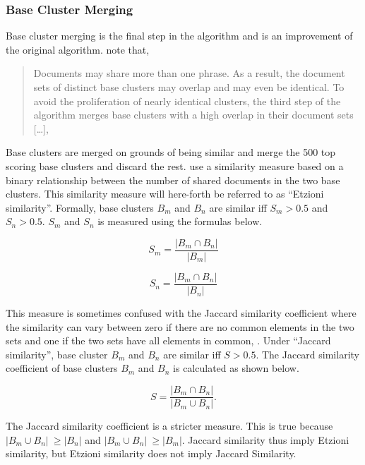 \subsubsection{Base Cluster Merging}
Base cluster merging is the final step in the \STC algorithm and is an improvement of the original algorithm. \citeauthor{Oren1998} note that,
\begin{quote}
Documents may share more than one phrase. As a result, the document sets of distinct base clusters may overlap and may even be identical. To avoid the proliferation of nearly identical clusters, the third step of the algorithm merges base clusters with a high overlap in their document sets [\dots], \parencite[][3]{Oren1998}
\end{quote}

Base clusters are merged on grounds of being similar and \cite{Oren1998} merge the 500 top scoring base clusters and discard the rest. \citeauthor{Oren1998} use a similarity measure based on a binary relationship between the number of shared documents in the two base clusters. This similarity measure will here-forth be referred to as ``Etzioni similarity''. Formally, base clusters \(B_m\) and \(B_n\) are similar iff \(S_{m} > 0.5\) and \(S_{n} > 0.5 \). \(S_{m}\) and \(S_{n}\) is measured using the formulas below.

\begin{displaymath} 
S_{m} = 
\frac{\vert B_{m} \cap B_{n} \vert} {\vert B_{m} \vert}
\end{displaymath}

\begin{displaymath} 
S_{n} = 
\frac{\vert B_{m} \cap B_{n} \vert} {\vert B_{n} \vert}
\end{displaymath}

This measure is sometimes confused with the Jaccard similarity coefficient where the similarity can vary between zero if there are no common elements in the two sets and one if the two sets have all elements in common, \parencite{VanRijsbergen1979}. Under ``Jaccard similarity'', base cluster \(B_{m}\) and \(B_{n}\) are similar iff \(S > 0.5\). The Jaccard similarity coefficient of base clusters \(B_{m}\) and \(B_{n}\) is calculated as shown below.

\begin{displaymath} 
S = 
\frac{\vert B_{m} \cap B_{n} \vert} {\vert B_{m} \cup B_{n} \vert}.
\end{displaymath}

The Jaccard similarity coefficient is a stricter measure. This is true because \(\vert B_{m} \cup B_{n} \vert\ \geq \vert B_{n} \vert\) and \(\vert B_{m} \cup B_{n} \vert\ \geq \vert B_{m} \vert\). Jaccard similarity thus imply Etzioni similarity, but Etzioni similarity does not imply Jaccard Similarity.

